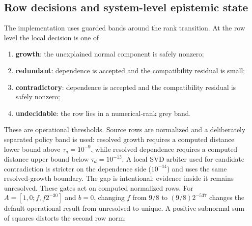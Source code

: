 \documentclass[11pt]{article}
\theoremstyle{definition}
\begin{document}
\subsection{Row decisions and system-level epistemic state}
The implementation uses guarded bands around the rank transition. At the row level the local decision is one of
\begin{enumerate}[label=(\alph*)]
\item \textbf{growth}: the unexplained normal component is safely nonzero;
\item \textbf{redundant}: dependence is accepted and the compatibility residual is small;
\item \textbf{contradictory}: dependence is accepted and the compatibility residual is safely nonzero;
\item \textbf{undecidable}: the row lies in a numerical-rank grey band.
\end{enumerate}
These are operational thresholds. Source rows are normalized and a deliberately separated policy band is used: resolved growth requires a computed distance lower bound above $\tau_g=10^{-9}$, while resolved dependence requires a computed distance upper bound below $\tau_d=10^{-13}$. A local SVD arbiter used for candidate contradiction is stricter on the dependence side ($10^{-14}$) and uses the same resolved-growth boundary. The gap is intentional: evidence inside it remains unresolved. These gates act on computed normalized rows. For $A=[1,0;f,f2^{-30}]$ and $b=0$, changing $f$ from $9/8$ to $(9/8)2^{-537}$ changes the default operational result from unresolved to unique. A positive subnormal sum of squares distorts the second row norm.
\end{document}
